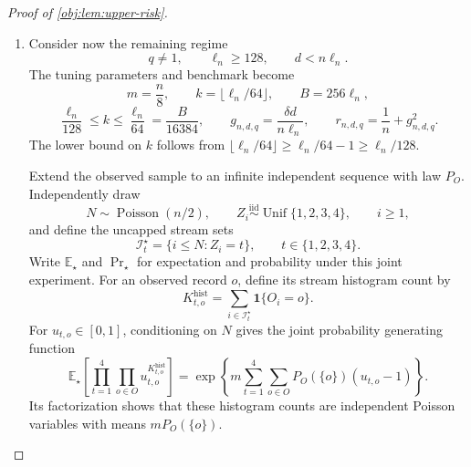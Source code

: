 \begin{proof}[Proof of \cref{obj:lem:upper-risk}]
\begin{enumerate}
\item Consider now the remaining regime
\[
q\ne1,\qquad \ell_n\ge128,\qquad d<n\ell_n.
\]
The tuning parameters and benchmark become
\[
m=\frac n8,\qquad
k=\lfloor\ell_n/64\rfloor,\qquad
B=256\ell_n,
\]
\[
\frac{\ell_n}{128}\le k\le\frac{\ell_n}{64}
=\frac{B}{16384},
\qquad
g_{n,d,q}=\frac{\delta d}{n\ell_n},
\qquad
r_{n,d,q}=\frac1n+g_{n,d,q}^2.
\]
The lower bound on \(k\) follows from
\(\lfloor\ell_n/64\rfloor\ge\ell_n/64-1\ge\ell_n/128\).

Extend the observed sample to an infinite independent sequence with law \(P_O\). Independently draw
\[
N\sim\operatorname{Poisson}(n/2),
\qquad
Z_i\stackrel{\mathrm{iid}}{\sim}\operatorname{Unif}\{1,2,3,4\},
\qquad i\ge1,
\]
and define the uncapped stream sets
\[
\mathcal I_t^\star=\{i\le N:Z_i=t\},
\qquad t\in\{1,2,3,4\}.
\]
Write \(\mathbb E_\star\) and \(\Pr_\star\) for expectation and probability under this joint experiment. For an observed record \(o\), define its stream histogram count by
\[
K_{t,o}^{\mathrm{hist}}
=\sum_{i\in\mathcal I_t^\star}\mathbf1\{O_i=o\}.
\]
For \(u_{t,o}\in[0,1]\), conditioning on \(N\) gives the joint probability generating function
\[
\mathbb E_\star\!\left[
\prod_{t=1}^4\prod_{o\in O}
u_{t,o}^{K_{t,o}^{\mathrm{hist}}}\right]
=
\exp\!\left\{
m\sum_{t=1}^4\sum_{o\in O}P_O(\{o\})(u_{t,o}-1)
\right\}.
\]
Its factorization shows that these histogram counts are independent Poisson variables with means \(mP_O(\{o\})\).


\end{enumerate}
\end{proof}

